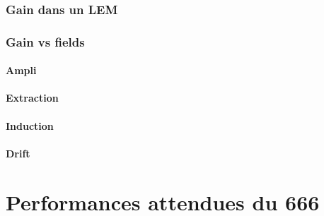             \subsubsection{Gain dans un LEM}
            \subsubsection{Gain vs fields}
                \paragraph{Ampli}
                \paragraph{Extraction}
                \paragraph{Induction}
                \paragraph{Drift}
    
    \section{Performances attendues du 666}